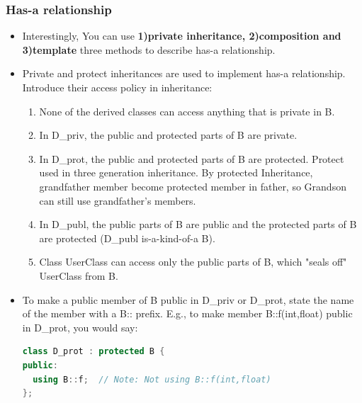 \documentclass[a4paper,12pt,twoside]{book}
\begin{document}
\subsubsection{Has-a relationship}

\begin{itemize}
\item Interestingly, You can use \textbf{1)private inheritance, 2)composition and 3)template} three methods to describe has-a relationship.

\item Private and protect inheritances are used to implement has-a relationship. Introduce their access policy in inheritance:
\begin{enumerate}
\begin{lstlisting}[frame=single, language=c++]
class B                    { /*...*/ };
class D_priv : private   B { /*...*/ };
class D_prot : protected B { /*...*/ };
class D_publ : public    B { /*...*/ };
class UserClass            { B b; /*...*/ };
\end{lstlisting}


\item None of the derived classes can access anything that is private in B.

\item In D\_priv, the public and protected parts of B are private.

\item In D\_prot, the public and protected parts of B are protected. Protect used in three generation inheritance. By protected Inheritance, grandfather member become protected member in father, so Grandson can still use grandfather's members.

\item In D\_publ, the public parts of  B are public and the protected parts of B are protected (D\_publ is-a-kind-of-a B).

\item Class UserClass can access only the public parts of B, which "seals off" UserClass from B.
\end{enumerate}


\item To make a public member of B public in D\_priv or D\_prot, state the name of the member with a B:: prefix. E.g., to make member B::f(int,float) public in D\_prot, you would say:
\begin{lstlisting}[frame=single, language=c++]
class D_prot : protected B {
public:
  using B::f;  // Note: Not using B::f(int,float)
};
\end{lstlisting}


\end{itemize}
\end{document}
